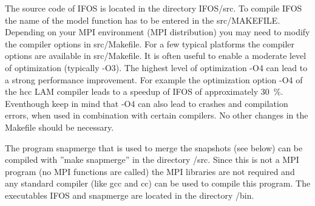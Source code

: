 The source code of IFOS is located in the directory IFOS/src. To compile IFOS the name of the model function has to be entered in the src/MAKEFILE. Depending on your MPI environment (MPI distribution) you may need to modify the compiler options in src/Makefile. For a few typical platforms the compiler options are available in src/Makefile. It is often useful to enable a moderate level of optimization (typically -O3). The highest level of optimization -O4 can lead to a strong performance improvement. For example the optimization option -O4 of the hcc LAM compiler leads to a speedup of IFOS of approximately 30~\%. Eventhough keep in mind that -O4 can also lead to crashes and compilation errors, when used in combination with certain compilers. No other changes in the Makefile should be necessary. 
{\color{blue}{\begin{verbatim}
# Makefile for IFOS

#--------------------------------------------------------
# edit here:

# source code for model generation

#MODEL = hh.c
MODEL = ../genmod/1D_linear_gradient_visc.c
MODEL_AC = ../genmod/1D_linear_gradient_ac.c
MODEL_EL = ../genmod/1D_linear_gradient_el.c
MODEL_VAC = ../genmod/1D_linear_gradient_viscac.c
EXEC= ../bin

# Description:
# CC = Compiler
# LFLAGS = Linker flag
# CFLAGS = Compiler flag

# LINUX with OpenMPI / IntelMPI and INTEL Compiler
# Use icc whenever possible, this will be much faster than gcc
CC=mpiicc
LFLAGS=-lm -lcseife -lstfinv -laff -lfourierxx -lfftw3 -lstdc++
CFLAGS=-O3
SFLAGS=-L./../contrib/libcseife -L./../contrib/bin
IFLAGS=-I./../contrib/libcseife -I./../contrib/header -I.

# LINUX with OpenMPI / IntelMPI and GCC Compiler
#CC=mpicc
#LFLAGS=-lm -lcseife -lstfinv -laff -lfourierxx -lfftw3 -lstdc++
#CFLAGS=-O3
#SFLAGS=-L./../contrib/libcseife -L./../contrib/bin
#IFLAGS=-I./../contrib/libcseife -I./../contrib/header -I.


# after this line, no further editing should be necessary
# --------------------------------------------------------
\end{verbatim}}} 

The program snapmerge that is used to merge the snapshots (see below) can be compiled with ''make snapmerge'' in the directory /src. Since this is not a MPI program (no MPI functions are called) the MPI libraries are not required and any standard compiler (like gcc and cc) can be used to compile this program. The executables IFOS and snapmerge are located in the directory /bin. 

